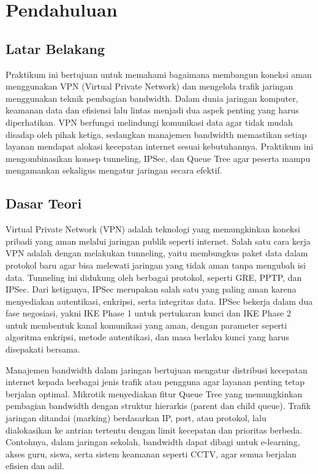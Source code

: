 \section{Pendahuluan}
\subsection{Latar Belakang}
Praktikum ini bertujuan untuk memahami bagaimana membangun koneksi aman menggunakan VPN (Virtual Private Network) dan mengelola trafik jaringan menggunakan teknik pembagian bandwidth. Dalam dunia jaringan komputer, keamanan data dan efisiensi lalu lintas menjadi dua aspek penting yang harus diperhatikan. VPN berfungsi melindungi komunikasi data agar tidak mudah disadap oleh pihak ketiga, sedangkan manajemen bandwidth memastikan setiap layanan mendapat alokasi kecepatan internet sesuai kebutuhannya. Praktikum ini mengombinasikan konsep tunneling, IPSec, dan Queue Tree agar peserta mampu mengamankan sekaligus mengatur jaringan secara efektif.

\subsection{Dasar Teori}
Virtual Private Network (VPN) adalah teknologi yang memungkinkan koneksi pribadi yang aman melalui jaringan publik seperti internet. Salah satu cara kerja VPN adalah dengan melakukan tunneling, yaitu membungkus paket data dalam protokol baru agar bisa melewati jaringan yang tidak aman tanpa mengubah isi data. Tunneling ini didukung oleh berbagai protokol, seperti GRE, PPTP, dan IPSec. Dari ketiganya, IPSec merupakan salah satu yang paling aman karena menyediakan autentikasi, enkripsi, serta integritas data. IPSec bekerja dalam dua fase negosiasi, yakni IKE Phase 1 untuk pertukaran kunci dan IKE Phase 2 untuk membentuk kanal komunikasi yang aman, dengan parameter seperti algoritma enkripsi, metode autentikasi, dan masa berlaku kunci yang harus disepakati bersama.

Manajemen bandwidth dalam jaringan bertujuan mengatur distribusi kecepatan internet kepada berbagai jenis trafik atau pengguna agar layanan penting tetap berjalan optimal. Mikrotik menyediakan fitur Queue Tree yang memungkinkan pembagian bandwidth dengan struktur hierarkis (parent dan child queue). Trafik jaringan ditandai (marking) berdasarkan IP, port, atau protokol, lalu dialokasikan ke antrian tertentu dengan limit kecepatan dan prioritas berbeda. Contohnya, dalam jaringan sekolah, bandwidth dapat dibagi untuk e-learning, akses guru, siswa, serta sistem keamanan seperti CCTV, agar semua berjalan efisien dan adil.

